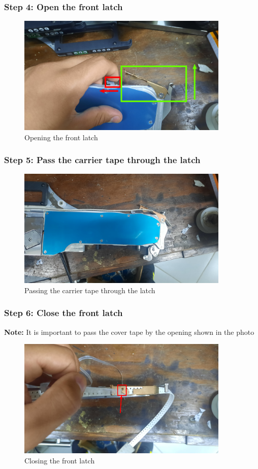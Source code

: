 \documentclass[a4paper,10pt]{report}
\begin{document}
\subsubsection{Step 4: Open the front latch}
\begin{figure}[!htb]
 \centering
 \includegraphics[width=0.9\textwidth]{images/step4.png}
 \caption{Opening the front latch}
\end{figure}
\subsubsection{Step 5: Pass the carrier tape through the latch}
\begin{figure}[!htb]
 \centering
 \includegraphics[width=0.9\textwidth]{images/step5.jpg}
 \caption{Passing the carrier tape through the latch}
\end{figure}
\newpage
\subsubsection{Step 6: Close the front latch}
\textbf{Note: } It is important to pass the cover tape by the opening shown in the photo
\begin{figure}[!htb]
 \centering
 \includegraphics[width=0.9\textwidth]{images/step6.png}
 \caption{Closing the front latch}
\end{figure}
\newpage
\end{document}
